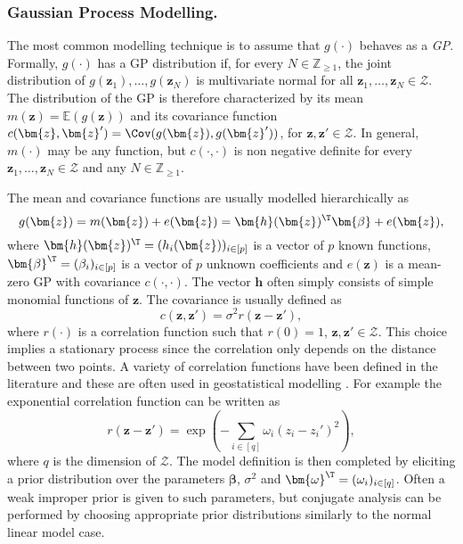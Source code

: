 \subsubsection{Gaussian Process Modelling.}
The most common modelling technique is to assume that $g(\cdot)$ behaves as a \textit{\gls{GP}}. Formally, $g(\cdot)$ has a \gls{GP} distribution if, for every $N\in\mathbb{Z}_{\geq 1}$, the joint distribution of $g(\bm{z}_1),\dots,g(\bm{z}_N)$ is multivariate normal for all $\bm{z}_1,\dots,\bm{z}_N\in\bm{\mathcal{Z}}$. The distribution of the \gls{GP} is therefore characterized by its mean $m(\bm{z})=\mathbb{E}(g(\bm{z}))$ and its covariance function $c(\bm{z},\bm{z}')=\Cov(g(\bm{z}),g(\bm{z}'))$, for $\bm{z},\bm{z}'\in\bm{\mathcal{Z}}$. In general, $m(\cdot)$ may be any function, but $c(\cdot,\cdot)$ is non negative definite for every $\bm{z}_1,\dots,\bm{z}_N\in\bm{\mathcal{Z}}$ and any $N\in\mathbb{Z}_{\geq 1}$.

The mean and covariance functions are usually modelled hierarchically as
\begin{equation*}
\label{eq:emulator}
g(\bm{z})=m(\bm{z})+e(\bm{z})=\bm{h}(\bm{z})^\T\bm{\beta}+e(\bm{z}),
\end{equation*}
where $\bm{h}(\bm{z})^\T=(h_i(\bm{z}))_{i\in[p]}$ is a vector of $p$ known functions, $\bm{\beta}^\T=(\beta_i)_{i\in[p]}$ is a vector of $p$ unknown coefficients and $e(\bm{z})$ is a mean-zero \gls{GP}  with covariance $c(\cdot,\cdot)$.
The vector $\bm{h}$ often simply consists of simple monomial functions of $\bm{z}$. The covariance is usually defined as 
\begin{equation*}
\label{eq:emulatorcovariance}
c(\bm{z},\bm{z}')=\sigma^2r(\bm{z}-\bm{z}'),
\end{equation*}
where $r(\cdot)$ is a correlation function such that $r(0)=1$, $\bm{z},\bm{z}'\in\bm{\mathcal{Z}}$. This choice implies a stationary process since the correlation only depends on the distance between two points. A variety of correlation functions have been defined in the literature and these are often used in geostatistical modelling \citep{Diggle2007}. For example the exponential correlation function can be written as
\begin{equation*}
\label{eq:emulatorcorrelation}
r(\bm{z}-\bm{z}')=\exp\left(-\sum_{i\in[q]}\omega_i(z_i-z_i')^2\right),
\end{equation*}
where $q$ is the dimension of $\bm{\mathcal{Z}}$. The model definition is then completed by eliciting a prior distribution over the parameters $\bm{\beta}$, $\sigma^2$ and $\bm{\omega}^\T=(\omega_i)_{i\in[q]}$. Often a weak improper prior is given to such parameters, but conjugate analysis can be performed by choosing appropriate prior distributions similarly to the normal linear model case. 

